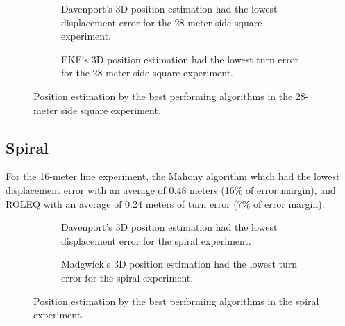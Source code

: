 \begin{figure}[!h]
    \centering
    \begin{subfigure}{0.49\textwidth}
        \centering
        \resizebox{1\linewidth}{!}{}
        \caption{Davenport's 3D position estimation had the lowest displacement error for the 28-meter side square experiment.}
        \label{fig:square282D}
    \end{subfigure}
    \begin{subfigure}{0.49\textwidth}
        \centering
        \resizebox{1\linewidth}{!}{}
        \caption{EKF's 3D position estimation had the lowest turn error for the 28-meter  side square experiment.}
        \label{fig:square283D}
    \end{subfigure}
    \caption{Position estimation by the best performing algorithms in the 28-meter side square experiment.}
    \label{fig:square28}
\end{figure}

\subsection{Spiral}

For the 16-meter line experiment, the Mahony algorithm which had the lowest displacement error with an average of 0.48 meters (16\% of error margin), and ROLEQ with an average of 0.24 meters of turn error (7\% of error margin).

\begin{figure}[!h]
    \centering
    
\end{figure}

\begin{figure}[!h]
    \centering
    \begin{subfigure}{0.49\textwidth}
        \centering
        \resizebox{1\linewidth}{!}{}
        \caption{Davenport's 3D position estimation had the lowest displacement error for the spiral experiment.}
        \label{fig:spiral2D}
    \end{subfigure}
    \begin{subfigure}{0.49\textwidth}
        \centering
        \resizebox{1\linewidth}{!}{}
        \caption{Madgwick's 3D position estimation had the lowest turn error for the spiral experiment.}
        \label{fig:spiral3D}
    \end{subfigure}
    \caption{Position estimation by the best performing algorithms in the spiral experiment.}
    \label{fig:spiral}
\end{figure}

